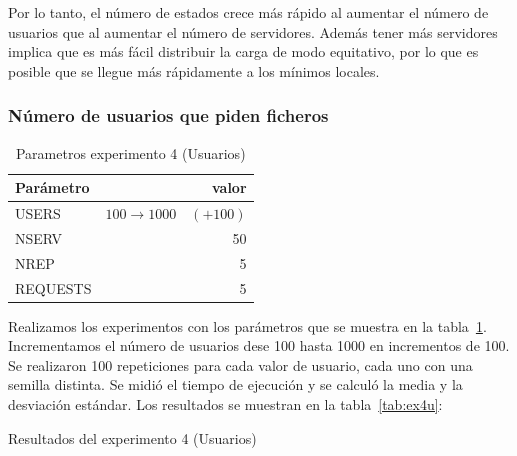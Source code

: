 Por lo tanto, el número de estados crece más rápido al aumentar el número de usuarios que al aumentar
el número de servidores. Además tener más servidores implica que es más fácil distribuir la carga de modo
equitativo, por lo que es posible que se llegue más rápidamente a los mínimos locales.

\subsubsection{Número de usuarios que piden ficheros}

\begin{table}[H]
    \caption{Parametros experimento 4 (Usuarios)}%
    \label{tab:ex4u_par}
    \begin{center}
    \begin{tabular}{lr}
    \toprule
    Parámetro & valor \\
    \midrule
    USERS & $100 \to 1000 \quad (+100)$ \\
    NSERV & 50 \\
    NREP & 5 \\
    REQUESTS & 5\\
    \bottomrule
    \end{tabular}
    \end{center}
\end{table}

Realizamos los experimentos con los parámetros que se muestra en la tabla~\ref{tab:ex4u_par}. Incrementamos
el número de usuarios dese 100 hasta 1000 en incrementos de 100. Se realizaron 100 repeticiones para
cada valor de usuario, cada uno con una semilla distinta. Se midió el tiempo de ejecución y se calculó la media
y la desviación estándar. Los resultados se muestran en la tabla~\ref{tab:ex4u}:

\begin{table}[H]
    \caption{Resultados del experimento 4 (Usuarios)}%
    \label{tab:ex4u}
    \begin{center}
    
    \end{center}
\end{table}


